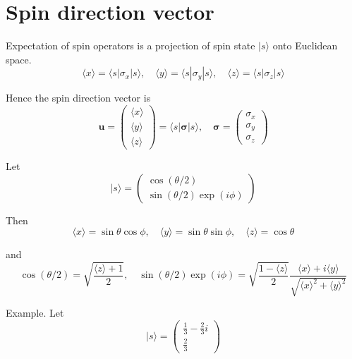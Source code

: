 

\section*{Spin direction vector}

Expectation of spin operators is a projection of spin state $|s\rangle$ onto Euclidean space.
\begin{equation*}
\langle x\rangle=\langle s|\sigma_x|s\rangle,
\quad
\langle y\rangle=\langle s|\sigma_y|s\rangle,
\quad
\langle z\rangle=\langle s|\sigma_z|s\rangle
\end{equation*}

Hence the spin direction vector is
\begin{equation*}
\mathbf u=\begin{pmatrix}\langle x\rangle\\\langle y\rangle\\\langle z\rangle\end{pmatrix}
=\langle s|\boldsymbol\sigma|s\rangle,
\quad
\boldsymbol\sigma=\begin{pmatrix}\sigma_x\\\sigma_y\\\sigma_z\end{pmatrix}
\end{equation*}

Let
\begin{equation*}
|s\rangle=\begin{pmatrix}\cos(\theta/2)\\\sin(\theta/2)\exp(i\phi)\end{pmatrix}
\end{equation*}

Then
\begin{equation*}
\langle x\rangle=\sin\theta\cos\phi,\quad
\langle y\rangle=\sin\theta\sin\phi,\quad
\langle z\rangle=\cos\theta
\end{equation*}

and
\begin{equation*}
\cos(\theta/2)=\sqrt{\frac{\langle z\rangle+1}{2}},\quad
\sin(\theta/2)\exp(i\phi)=\sqrt{\frac{1-\langle z\rangle}{2}}
\frac{\langle x\rangle+i\langle y\rangle}{\sqrt{\langle x\rangle^2+\langle y\rangle^2}}
\end{equation*}

Example. Let
\begin{equation*}
|s\rangle=\begin{pmatrix}\frac{1}{3}-\frac{2}{3}i\\[1ex]\frac{2}{3}\end{pmatrix}
\end{equation*}

